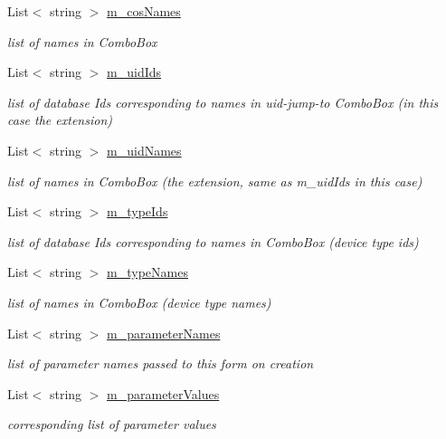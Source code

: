 \begin{DoxyCompactItemize}
List$<$ string $>$ \hyperlink{class_ias_pbx_config_1_1_extension_details_ab5b6312c7e2360dc541b257899c9f155}{m\_\-cosNames}
\begin{DoxyCompactList}\small\item\em list of names in ComboBox \item\end{DoxyCompactList}\item 
List$<$ string $>$ \hyperlink{class_ias_pbx_config_1_1_extension_details_a827f90a12300cda5f44afcd08fc2a854}{m\_\-uidIds}
\begin{DoxyCompactList}\small\item\em list of database Ids corresponding to names in uid-\/jump-\/to ComboBox (in this case the extension) \item\end{DoxyCompactList}\item 
List$<$ string $>$ \hyperlink{class_ias_pbx_config_1_1_extension_details_afe69a712727a96911d8c24927b15b779}{m\_\-uidNames}
\begin{DoxyCompactList}\small\item\em list of names in ComboBox (the extension, same as m\_\-uidIds in this case) \item\end{DoxyCompactList}\item 
List$<$ string $>$ \hyperlink{class_ias_pbx_config_1_1_extension_details_acce0ec857d3ed51a1137fdb07ab6ce57}{m\_\-typeIds}
\begin{DoxyCompactList}\small\item\em list of database Ids corresponding to names in ComboBox (device type ids) \item\end{DoxyCompactList}\item 
List$<$ string $>$ \hyperlink{class_ias_pbx_config_1_1_extension_details_a5bbad0dfeb7beed8ee4ca6da920a60e9}{m\_\-typeNames}
\begin{DoxyCompactList}\small\item\em list of names in ComboBox (device type names) \item\end{DoxyCompactList}\item 
List$<$ string $>$ \hyperlink{class_ias_pbx_config_1_1_extension_details_a0a375b1d694804212890f8b6fb739b21}{m\_\-parameterNames}
\begin{DoxyCompactList}\small\item\em list of parameter names passed to this form on creation \item\end{DoxyCompactList}\item 
List$<$ string $>$ \hyperlink{class_ias_pbx_config_1_1_extension_details_af61633a6131c4dfa44232218ab2026c8}{m\_\-parameterValues}
\begin{DoxyCompactList}\small\item\em corresponding list of parameter values \item\end{DoxyCompactList}\end{DoxyCompactItemize}
